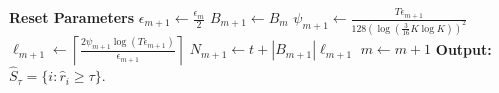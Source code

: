 \begin{algorithm}[t!]
\begin{algorithmic}
\vspace{-2mm}
\State {}
\State \textbf{Reset Parameters}
\State $\epsilon_{m+1}\leftarrow\frac{\epsilon_{m}}{2}$
\State $B_{m+1} \leftarrow B_{m}$
\State $\psi_{m+1}\leftarrow \frac{T\epsilon_{m+1}}{128(\log(\frac{3}{16}K\log K))^{2}}$
\State $\ell_{m+1}\leftarrow\left\lceil \frac{2\psi_{m+1}\log( T\epsilon_{m+1})}{\epsilon_{m+1}} \right\rceil$
\State $N_{m+1} \leftarrow t + |B_{m+1}|\ell_{m+1}$
\State $m \leftarrow m+1$
\EndIf
\EndFor
\State \textbf{Output:} $\hat{S}_{\tau}=\lbrace i: \hat{r}_{i}\geq \tau \rbrace$.
\end{algorithmic}
\end{algorithm}


